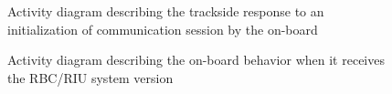 \documentclass{template/openetcs_report}
\begin{document}
\begin{figure}
  \centering
  \caption{Activity diagram describing the trackside response to an initialization of communication session by the on-board}
  \label{fig:Send_RBCRIU_System_Version}
\end{figure}

\begin{figure}
  \centering
  \caption{Activity diagram describing the on-board behavior when it receives the RBC/RIU system version}
  \label{fig:Consider_comm_session_established}
\end{figure}
\end{document}
